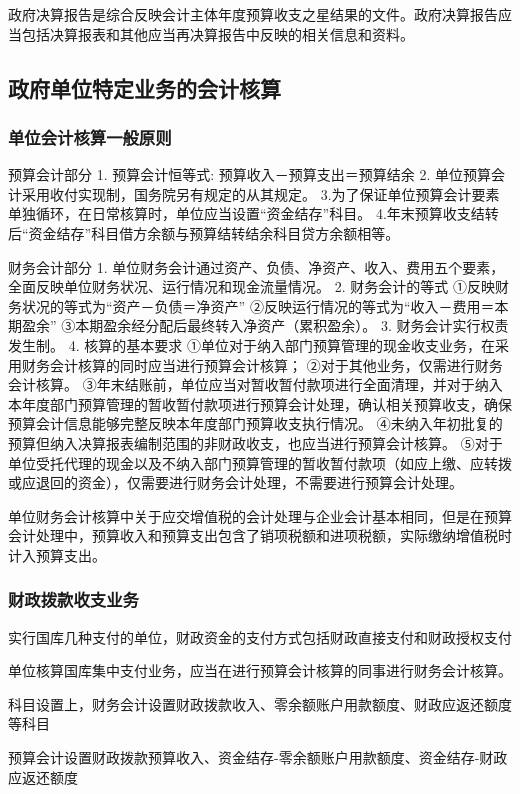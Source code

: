 \documentclass[UTF8,12pt]{ctexart}
\numberwithin{equation}{section} %
\numberwithin{figure}{section}
\numberwithin{table}{section}
\begin{document}
	政府决算报告是综合反映会计主体年度预算收支之星结果的文件。政府决算报告应当包括决算报表和其他应当再决算报告中反映的相关信息和资料。
	
	\subsection{政府单位特定业务的会计核算}
	\subsubsection{单位会计核算一般原则}
	预算会计部分
	1.	预算会计恒等式:
	预算收入－预算支出＝预算结余
	2.	单位预算会计采用收付实现制，国务院另有规定的从其规定。
	3.为了保证单位预算会计要素单独循环，在日常核算时，单位应当设置“资金结存”科目。
	4.年末预算收支结转后“资金结存”科目借方余额与预算结转结余科目贷方余额相等。
	
	
	财务会计部分
	1.	单位财务会计通过资产、负债、净资产、收入、费用五个要素，全面反映单位财务状况、运行情况和现金流量情况。
	2.	财务会计的等式
	①反映财务状况的等式为“资产－负债＝净资产”
	②反映运行情况的等式为“收入－费用＝本期盈余”
	③本期盈余经分配后最终转入净资产（累积盈余）。
	3.	财务会计实行权责发生制。
	4.	核算的基本要求
	①单位对于纳入部门预算管理的现金收支业务，在采用财务会计核算的同时应当进行预算会计核算；
	②对于其他业务，仅需进行财务会计核算。
	③年末结账前，单位应当对暂收暂付款项进行全面清理，并对于纳入本年度部门预算管理的暂收暂付款项进行预算会计处理，确认相关预算收支，确保预算会计信息能够完整反映本年度部门预算收支执行情况。
	④未纳入年初批复的预算但纳入决算报表编制范围的非财政收支，也应当进行预算会计核算。
	⑤对于单位受托代理的现金以及不纳入部门预算管理的暂收暂付款项（如应上缴、应转拨或应退回的资金），仅需要进行财务会计处理，不需要进行预算会计处理。
	
	单位财务会计核算中关于应交增值税的会计处理与企业会计基本相同，但是在预算会计处理中，预算收入和预算支出包含了销项税额和进项税额，实际缴纳增值税时计入预算支出。
	
	\subsubsection{财政拨款收支业务}
	实行国库几种支付的单位，财政资金的支付方式包括财政直接支付和财政授权支付
	
	单位核算国库集中支付业务，应当在进行预算会计核算的同事进行财务会计核算。
	
	科目设置上，财务会计设置财政拨款收入、零余额账户用款额度、财政应返还额度等科目
	
	预算会计设置财政拨款预算收入、资金结存-零余额账户用款额度、资金结存-财政应返还额度
	
\end{document}
